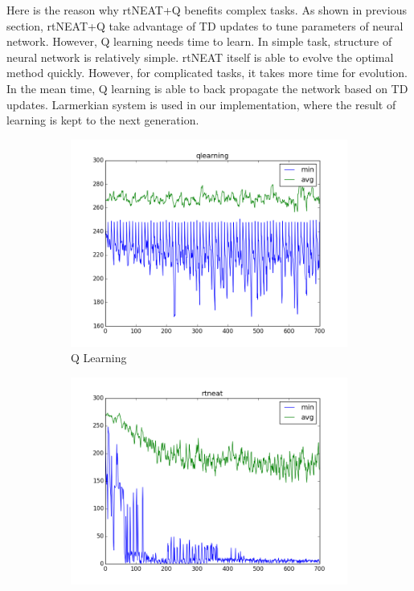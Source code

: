 \documentclass[letterpaper]{article}
\begin{document}
Here is the reason why rtNEAT+Q benefits complex tasks. As shown in previous section, rtNEAT+Q take advantage of TD updates to tune parameters of neural network. However, Q learning needs time to learn. In simple task, structure of neural network is relatively simple. rtNEAT itself is able to evolve the optimal method quickly. However, for complicated tasks, it takes more time for evolution. In the mean time, Q learning is able to back propagate the network based on TD updates. Larmerkian system is used in our implementation, where the result of learning is kept to the next generation. 
\begin{figure}[ht]
\centering
\begin{subfigure}{0.7\columnwidth}
  \centering
  \includegraphics[width=\columnwidth]{wall_qlearning.png}
  \caption{Q Learning}
  \label{fig:wall_q}
\end{subfigure}%
\begin{subfigure}{0.7\columnwidth}
  \centering
  \includegraphics[width=\columnwidth]{wall_rtneat.png}

\end{subfigure}
\end{figure}
\end{document}
